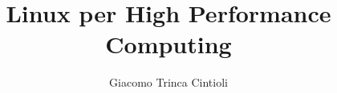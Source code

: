 \documentclass[11pt]{book}
\begin{document}
\title{\sc Linux per High Performance Computing}
\author{\sc Giacomo Trinca Cintioli}
\maketitle

\tableofcontents


\end{document}
